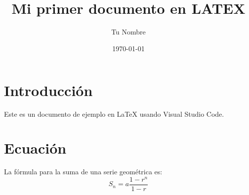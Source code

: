 \documentclass{article}
\title{Mi primer documento en LATEX}
\author{Tu Nombre}
\date{\today}
\begin{document}
\maketitle

\section{Introducción}
Este es un documento de ejemplo en \LaTeX{} usando Visual Studio Code.

\section{Ecuación}
La fórmula para la suma de una serie geométrica es:
\[
S_n = a \frac{1 - r^n}{1 - r}
\]
\end{document}
